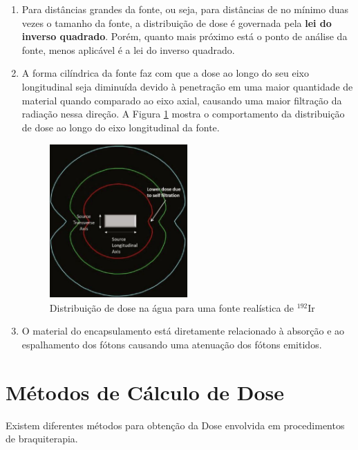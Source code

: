 \documentclass[11pt,a4paper]{article}
\begin{document}
		\begin{enumerate}
			\item Para distâncias grandes da fonte, ou seja, para distâncias de no mínimo duas vezes o tamanho da fonte, a distribuição de dose é governada pela \textbf{\textcolor{CarnationPink}{lei do inverso quadrado}}. Porém, quanto mais próximo está o ponto de análise da fonte, menos aplicável é a lei do inverso quadrado.
			
			\item A forma cilíndrica da fonte faz com que a dose ao longo do seu eixo longitudinal seja diminuída devido à penetração em uma maior quantidade de material quando comparado ao eixo axial, causando uma maior filtração da radiação nessa direção. A Figura \ref{img:distribuicaoDeDose} mostra o comportamento da distribuição de dose ao longo do eixo longitudinal da fonte.
			
				\begin{figure}[h]
					\centering
					\includegraphics[width=0.5\textwidth]{Imagens/distribuicaoDeDose.JPG}
					\caption{Distribuição de dose na água para uma fonte realística de $\mathrm{{}^{192}Ir}$}
					\label{img:distribuicaoDeDose}
				\end{figure}

			\item O material do encapsulamento está diretamente relacionado à absorção e ao espalhamento dos fótons causando uma atenuação dos fótons emitidos.
		\end{enumerate}
	
	\section{Métodos de Cálculo de Dose}

		Existem diferentes métodos para obtenção da Dose envolvida em procedimentos de braquiterapia. 
\end{document}
